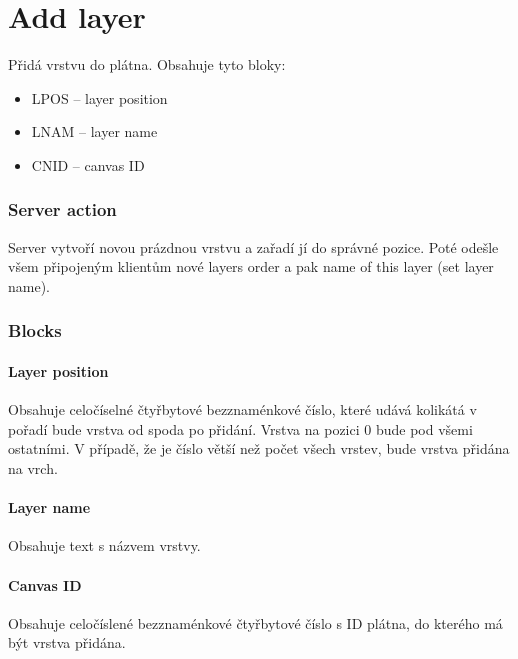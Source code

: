 \section{Add layer}

Přidá vrstvu do plátna. Obsahuje tyto bloky:

\begin{itemize}
	\item LPOS -- layer position
	\item LNAM -- layer name
	\item CNID -- canvas ID
\end{itemize}

\subsubsection{Server action}

Server vytvoří novou prázdnou vrstvu a zařadí jí do správné pozice. Poté odešle všem připojeným klientům nové layers order a pak name of this layer (set layer name).

\subsubsection{Blocks}

\paragraph{Layer position}

Obsahuje celočíselné čtyřbytové bezznaménkové číslo, které udává kolikátá v pořadí bude vrstva od spoda po přidání. Vrstva na pozici $0$ bude pod všemi ostatními. V případě, že je číslo větší než počet všech vrstev, bude vrstva přidána na vrch.

\paragraph{Layer name}

Obsahuje text s názvem vrstvy.

\paragraph{Canvas ID}

Obsahuje celočíslené bezznaménkové čtyřbytové číslo s ID plátna, do kterého má být vrstva přidána.